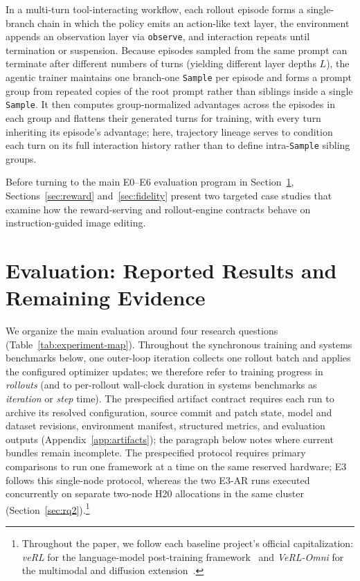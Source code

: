 \documentclass[10pt]{article}
\newcommand{\sample}{\texttt{Sample}}
\begin{document}
In a multi-turn tool-interacting workflow, each rollout episode forms a single-branch chain in which the policy emits an action-like text layer, the environment appends an observation layer via \texttt{observe}, and interaction repeats until termination or suspension.
Because episodes sampled from the same prompt can terminate after different numbers of turns (yielding different layer depths $L$), the agentic trainer maintains one branch-one \sample{} per episode and forms a prompt group from repeated copies of the root prompt rather than siblings inside a single \sample{}.
It then computes group-normalized advantages across the episodes in each group and flattens their generated turns for training, with every turn inheriting its episode's advantage; here, trajectory lineage serves to condition each turn on its full interaction history rather than to define intra-\sample{} sibling groups.

Before turning to the main E0--E6 evaluation program in Section~\ref{sec:evaluation}, Sections~\ref{sec:reward} and~\ref{sec:fidelity} present two targeted case studies that examine how the reward-serving and rollout-engine contracts behave on instruction-guided image editing.





\section{Evaluation: Reported Results and Remaining Evidence}
\label{sec:evaluation}

We organize the main evaluation around four research questions (Table~\ref{tab:experiment-map}).
Throughout the synchronous training and systems benchmarks below, one outer-loop iteration collects one rollout batch and applies the configured optimizer updates; we therefore refer to training progress in \emph{rollouts} (and to per-rollout wall-clock duration in systems benchmarks as \emph{iteration} or \emph{step} time).
The prespecified artifact contract requires each run to archive its resolved configuration, source commit and patch state, model and dataset revisions, environment manifest, structured metrics, and evaluation outputs (Appendix~\ref{app:artifacts}); the paragraph below notes where current bundles remain incomplete.
The prespecified protocol requires primary comparisons to run one framework at a time on the same reserved hardware; E3 follows this single-node protocol, whereas the two E3-AR runs executed concurrently on separate two-node H20 allocations in the same cluster (Section~\ref{sec:rq2}).\footnote{Throughout the paper, we follow each baseline project's official capitalization: \emph{veRL} for the language-model post-training framework~\citep{sheng2024hybridflow} and \emph{VeRL-Omni} for the multimodal and diffusion extension~\citep{verlomni2026}.}
\end{document}
